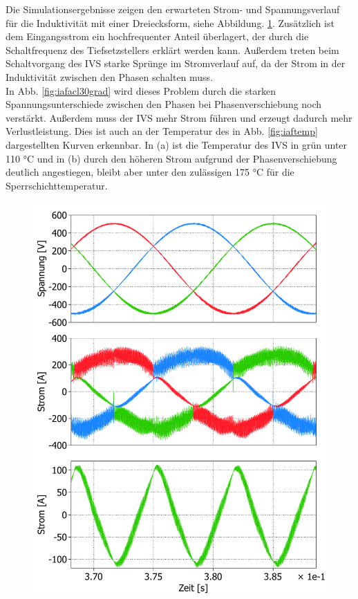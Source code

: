 Die Simulationsergebnisse zeigen den erwarteten Strom- und Spannungsverlauf für die Induktivität mit einer Dreiecksform, siehe Abbildung. \ref{fig:iafacl}. Zusätzlich ist dem Eingangsstrom ein hochfrequenter Anteil überlagert, der durch die Schaltfrequenz des Tiefsetzstellers erklärt werden kann. Außerdem treten beim Schaltvorgang des \gls{IVS} starke Sprünge im Stromverlauf auf, da der Strom in der Induktivität zwischen den Phasen schalten muss.\\
In Abb. \ref{fig:iafacl30grad} wird dieses Problem durch die starken Spannungsunterschiede zwischen den Phasen bei Phasenverschiebung noch verstärkt. Außerdem muss der \gls{IVS} mehr Strom führen und erzeugt dadurch mehr Verlustleistung. Dies ist auch an der Temperatur des in Abb. \ref{fig:iaftemp} dargestellten Kurven erkennbar. In (a) ist die Temperatur des IVS in grün unter 110 °C und in (b) durch den höheren Strom aufgrund der Phasenverschiebung deutlich angestiegen, bleibt aber unter den zulässigen 175 °C für die Sperrschichttemperatur.
\begin{figure}
	\centering
	\includegraphics[width=1\linewidth]{content/Grafiken/IAF_AC+L}
	\caption[Simulationsergebnisse des IAF ohne Phasenverschiebung, Eingangsspannung und Ströme, Strom in der IVS Induktivität ]{}
	\label{fig:iafacl}
\end{figure}

